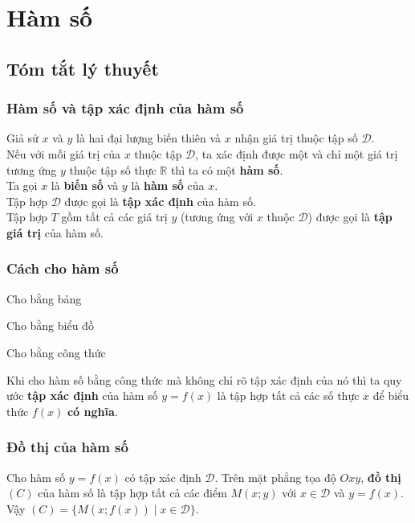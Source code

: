 \setcounter{section}{0}
\section{Hàm số}

\subsection{Tóm tắt lý thuyết}
\subsubsection{Hàm số và tập xác định của hàm số}
\begin{dn}{}
	Giả sử $x$ và $y$ là hai đại lượng biến thiên và $x$ nhận giá trị thuộc tập số $\mathscr{D}$.\\
	Nếu với mỗi giá trị của $x$ thuộc tập $\mathscr{D}$, ta xác định được một và chỉ một giá trị tương ứng $y$ thuộc tập số thực $\mathbb{R}$ thì ta có một \textbf{hàm số}. \\
	Ta gọi $x$ là \textbf{biến số} và $y$ là \textbf{hàm số} của $x$.\\
	Tập hợp $\mathscr{D}$ được gọi là \textbf{tập xác định} của hàm số.\\
	Tập hợp $T$ gồm tất cả các giá trị $y$ (tương ứng với $x$ thuộc $\mathscr{D}$) được gọi là \textbf{tập giá trị} của hàm số.
\end{dn}

\subsubsection{Cách cho hàm số}

\begin{listEX}[3]
	\item Cho bằng bảng
	\item Cho bằng biểu đồ
	\item Cho bằng công thức
\end{listEX}

\begin{note}
	Khi cho hàm số bằng công thức mà không chỉ rõ tập xác định của nó thì ta quy ước \textbf{tập xác định} của hàm số $y=f(x)$ là tập hợp tất cả các số thực $x$ để biểu thức $f(x)$ \textbf{có nghĩa}.
\end{note}

\subsubsection{Đồ thị của hàm số}
\begin{dn}{}
	Cho hàm số $y=f(x)$ có tập xác định $\mathscr{D}$. Trên mặt phẳng tọa độ $Oxy$, \textbf{đồ thị} $(C)$ của hàm số là tập hợp tất cả các điểm $M(x;y)$ với $x\in\mathscr{D}$ và $y=f(x)$.\\
	Vậy $(C)=\{M(x;f(x))\mid x\in\mathscr{D}\}$.
\end{dn}

